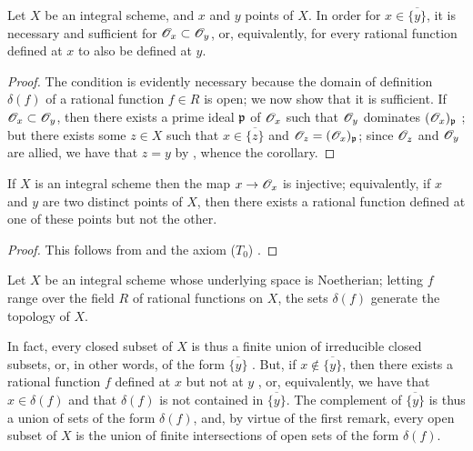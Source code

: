 \begin{cor}[8.2.3]
\label{1.8.2.3}
Let $X$ be an integral scheme, and $x$ and $y$ points of $X$.
In order for $x\in\overline{\{y\}}$, it is necessary and
sufficient for $\mathscr{O}_x\subset\mathscr{O}_y$, or, equivalently, for every rational
function defined at $x$ to also be defined at $y$.
\end{cor}

\begin{proof}
\label{proof-1.8.2.3}
The condition is evidently necessary because the domain of definition $\delta(f)$ of a rational function $f\in R$ is open;
we now show that it is sufficient.
If $\mathscr{O}_x\subset\mathscr{O}_y$, then there exists a prime ideal $\mathfrak{p}$ of $\mathscr{O}_x$ such that $\mathscr{O}_y$ dominates $(\mathscr{O}_x)_\mathfrak{p}$ ;
but  there exists some $z\in X$ such that $x\in\overline{\{z\}}$ and $\mathscr{O}_z=(\mathscr{O}_x)_\mathfrak{p}$;
since $\mathscr{O}_z$ and $\mathscr{O}_y$ are allied, we have that $z=y$ by , whence the corollary.
\end{proof}

\begin{cor}[8.2.4]
\label{1.8.2.4}
If $X$ is an integral scheme then the map $x\to\OO_x$ is injective; equivalently, if $x$ and $y$ are two distinct points of $X$, then there exists a rational function defined at one of these points but not the other.
\end{cor}

\begin{proof}
\label{proof-1.8.2.4}
This follows from  and the axiom ($T_0$) .
\end{proof}

\begin{cor}[8.2.5]
\label{1.8.2.5}
Let $X$ be an integral scheme whose underlying space is Noetherian;
letting $f$ range over the field $R$ of rational functions on $X$, the sets $\delta(f)$ generate the topology of $X$.
\end{cor}

In fact, every closed subset of $X$ is thus a finite union of irreducible closed subsets, or, in other words, of the form $\overline{\{y\}}$ .
But, if $x\not\in\overline{\{y\}}$, then there exists a rational function $f$ defined at $x$ but not at $y$ , or, equivalently, we have that $x\in\delta(f)$ and that $\delta(f)$ is not contained in $\overline{\{y\}}$.
The complement of $\overline{\{y\}}$ is thus a union of sets of the form $\delta(f)$, and, by virtue of the first remark, every open subset of $X$ is the union of finite intersections of open sets of the form $\delta(f)$.

